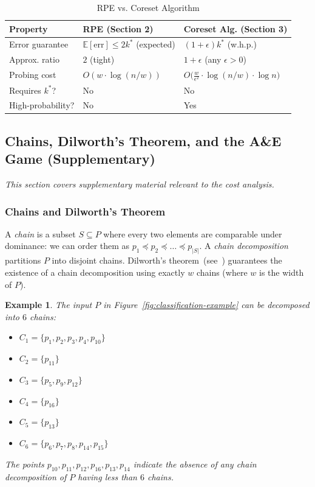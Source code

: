 \documentclass[11pt, a4paper]{article}
\theoremstyle{boxed}
\newtheorem{innerexample}{Example}[section]
\newenvironment{example}
  {\begin{mdframed}[style=thmstyle]\begin{innerexample}}
  {\end{innerexample}\end{mdframed}}
\begin{document}
\begin{table}[ht]
\centering
\caption{RPE vs. Coreset Algorithm}
\begin{tabular}{lll}
\toprule
\textbf{Property} & \textbf{RPE (Section 2)} & \textbf{Coreset Alg. (Section 3)} \\
\midrule
Error guarantee & $\mathbb{E}[\text{err}] \le 2k^*$ (expected) & $(1+\epsilon)k^*$ (w.h.p.) \\
Approx. ratio & $2$ (tight) & $1+\epsilon$ (any $\epsilon > 0$) \\
Probing cost & $O(w \cdot \log(n/w))$ & $O\bigl(\frac{w}{\epsilon^2} \cdot \log(n/w) \cdot \log n\bigr)$ \\
Requires $k^*$? & No & No \\
High-probability? & No & Yes \\
\bottomrule
\end{tabular}
\end{table}

\subsection{Chains, Dilworth's Theorem, and the A\&E Game (Supplementary)}
\emph{This section covers supplementary material relevant to the cost analysis.}

\subsubsection{Chains and Dilworth's Theorem\label{sec:chains}} 
A \emph{chain} is a subset $S \subseteq P$ where every two elements are comparable under dominance: we can order them as $p_1 \preceq p_2 \preceq \dots \preceq p_{|S|}$. A \emph{chain decomposition} partitions $P$ into disjoint chains. Dilworth's theorem~(see~\cite{tao26}) guarantees the existence of a chain decomposition using exactly $w$ chains (where $w$ is the width of $P$).

\begin{example}
The input $P$ in Figure~\ref{fig:classification-example} can be decomposed into $6$ chains:
\begin{itemize}
    \item $C_1 = \{p_1, p_2, p_3, p_4, p_{10}\}$
    \item $C_2 = \{p_{11}\}$
    \item $C_3 = \{p_5, p_9, p_{12}\}$
    \item $C_4 = \{p_{16}\}$
    \item $C_5 = \{p_{13}\}$
    \item $C_6 = \{p_6, p_7, p_8, p_{14}, p_{15}\}$
\end{itemize}
The points $p_{10}, p_{11}, p_{12}, p_{16}, p_{13}, p_{14}$ indicate the absence of any chain decomposition of $P$ having less than $6$ chains.
\end{example}
\newpage
\end{document}
